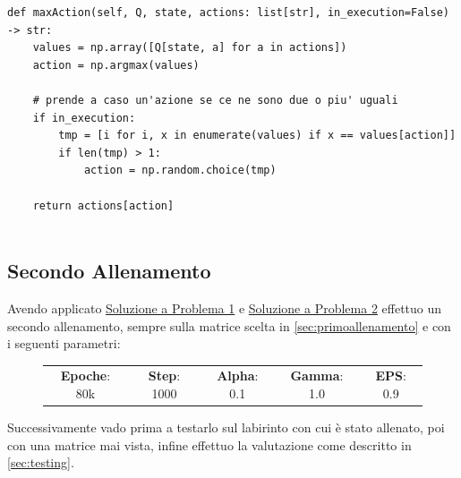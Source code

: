 \begin{lstlisting}[style=python, caption={Modifica per risoluzione a Problema 2}]
def maxAction(self, Q, state, actions: list[str], in_execution=False) -> str:
	values = np.array([Q[state, a] for a in actions])
	action = np.argmax(values)

	# prende a caso un'azione se ce ne sono due o piu' uguali
	if in_execution:
		tmp = [i for i, x in enumerate(values) if x == values[action]]
		if len(tmp) > 1:
			action = np.random.choice(tmp)
			
	return actions[action]
	
\end{lstlisting}

\subsection{Secondo Allenamento}

Avendo applicato \hyperref[sec:solprob1]{Soluzione a Problema 1} e \hyperref[sec:solprob2]{Soluzione a Problema 2} effettuo un secondo allenamento, sempre sulla matrice scelta in \autoref{sec:primoallenamento} e con i seguenti parametri:

\begin{figure}[H]
	\centering
	\begin{tabular}{c | c | c | c | c}
		\textbf{Epoche}: 80k & \textbf{Step}: 1000 & \textbf{Alpha}: 0.1 & \textbf{Gamma}: 1.0 & \textbf{EPS}: 0.9\\
	\end{tabular}
\end{figure}

Successivamente vado prima a testarlo sul labirinto con cui \`{e} stato allenato, poi con una matrice mai vista, infine effettuo la valutazione come descritto in \autoref{sec:testing}.

